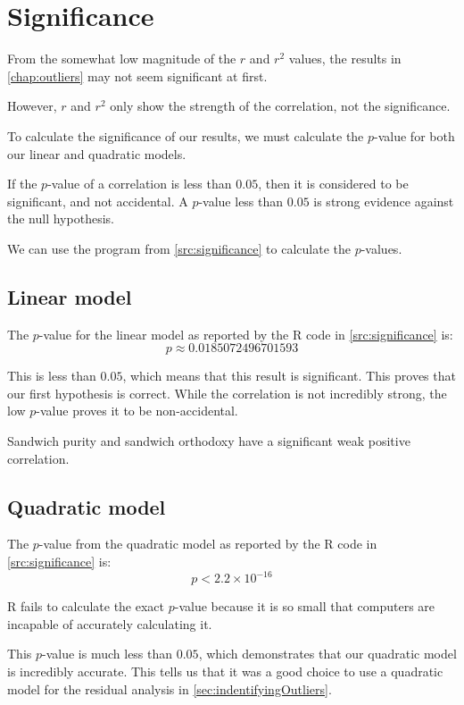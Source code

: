 \chapter{Significance}\label{chap:significance}

From the somewhat low magnitude of the $r$ and $r^2$ values, the results in \vref{chap:outliers} may not seem significant at first.

However, $r$ and $r^2$ only show the strength of the correlation, not the significance.

To calculate the significance of our results, we must calculate the $p$-value for both our linear and quadratic models.\cite{pVals}

If the $p$-value of a correlation is less than $0.05$, then it is considered to be significant, and not accidental.
A $p$-value less than $0.05$ is strong evidence against the null hypothesis.\cite{pVals}

We can use the program from \vref{src:significance} to calculate the $p$-values.

\section{Linear model}
The $p$-value for the linear model as reported by the R code in \vref{src:significance} is:
\[p \approx \num{0.0185072496701593}\]

This is less than $0.05$, which means that this result is significant.
This proves that our first hypothesis is correct.
While the correlation is not incredibly strong, the low $p$-value proves it to be non-accidental.

Sandwich purity and sandwich orthodoxy have a significant weak positive correlation.

\section{Quadratic model}
The $p$-value from the quadratic model as reported by the R code in \vref{src:significance} is:
\[p < 2.2 \times 10 ^ {-16}\]

R fails to calculate the exact $p$-value because it is so small that computers are incapable of accurately calculating it.

This $p$-value is much less than $0.05$, which demonstrates that our quadratic model is incredibly accurate.
This tells us that it was a good choice to use a quadratic model for the residual analysis in \vref{sec:indentifyingOutliers}.
